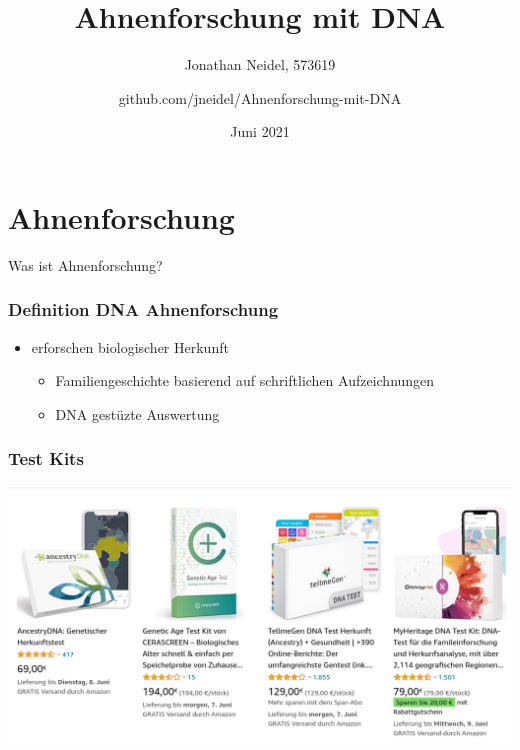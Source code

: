 \documentclass{beamer}
\title{Ahnenforschung mit DNA}
\subtitle{}
\author{Jonathan Neidel, 573619 \and github.com/jneidel/Ahnenforschung-mit-DNA}
\date{Juni 2021}
\institute{HTW Berlin, Angewandte Informatik, Datenschutz und Datensicherheit}
\begin{document}
\frame{\titlepage}

\section{Ahnenforschung}
\begin{frame}
  \begin{center}
    {\Huge Was ist Ahnenforschung?}
  \end{center}
\end{frame}

\begin{frame}
  \frametitle{Definition DNA Ahnenforschung}

  \begin{itemize}
    \item erforschen biologischer Herkunft
      \begin{itemize}
        \item Familiengeschichte basierend auf schriftlichen Aufzeichnungen
        \item DNA gestüzte Auswertung
      \end{itemize}
  \end{itemize}
\end{frame}

\begin{frame}
  \frametitle{Test Kits}

  \centering
    \includegraphics[scale=0.3]{test-kits}
\end{frame}
\end{document}

